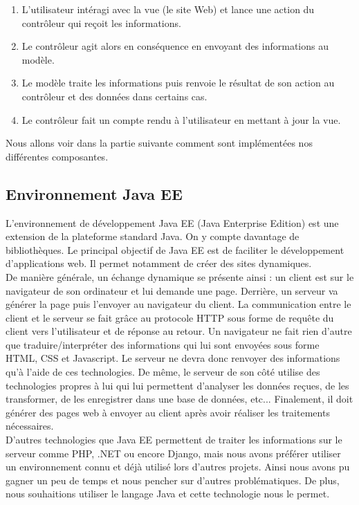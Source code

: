 \begin{enumerate}
 \item L'utilisateur intéragi avec la vue (le site Web) et lance une action du contrôleur qui reçoit les informations.
 \item Le contrôleur agit alors en conséquence en envoyant des informations au modèle.
 \item Le modèle traite les informations puis renvoie le résultat de son action au contrôleur et des données dans certains cas.
 \item Le contrôleur fait un compte rendu à l'utilisateur en mettant à jour la vue.
\end{enumerate}

Nous allons voir dans la partie suivante comment sont implémentées nos différentes composantes.

\subsection{Environnement Java EE}
L'environnement de développement Java EE (Java Enterprise Edition) est une extension de la plateforme standard Java. On y compte davantage de bibliothèques. Le principal objectif de Java EE est de faciliter le développement d'applications web. Il permet notamment de créer des sites dynamiques.\\

De manière générale, un échange dynamique se présente ainsi : un client est sur le navigateur de son ordinateur et lui demande une page. Derrière, un serveur va générer la page puis l'envoyer au navigateur du client.
La communication entre le client et le serveur se fait grâce au protocole HTTP sous forme de requête du client vers l'utilisateur et de réponse au retour.
Un navigateur ne fait rien d'autre que traduire/interpréter des informations qui lui sont envoyées sous forme HTML, CSS et Javascript. Le serveur ne devra donc renvoyer des informations qu'à l'aide de ces technologies.
De même, le serveur de son côté utilise des technologies propres à lui qui lui permettent d'analyser les données reçues, de les transformer, de les enregistrer dans une base de données, etc... Finalement, il doit générer des pages web à envoyer au client après avoir réaliser les traitements nécessaires.\\

D'autres technologies que Java EE permettent de traiter les informations sur le serveur comme PHP, .NET ou encore Django, mais nous avons préférer utiliser un environnement connu et déjà utilisé lors d'autres projets. Ainsi nous avons pu gagner un peu de temps et nous pencher sur d'autres problématiques. De plus, nous souhaitions utiliser le langage Java et cette technologie nous le permet.

